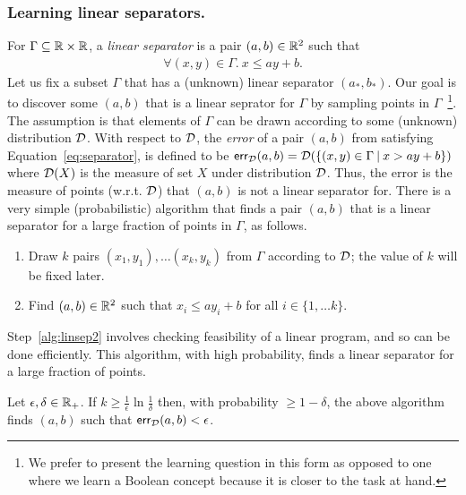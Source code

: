 \subsubsection{Learning linear separators.}
\label{Sec: discrepancy}
For $\Gamma \subseteq \reals\times\reals$, a \emph{linear separator}
is a pair $(a,b) \in \reals^2$ such that
\begin{align}
\forall (x,y) \in \Gamma.\ x \leq ay + b.
\label{eq:separator}
\end{align}
Let us fix a subset $\Gamma$ that has a (unknown) linear separator
$(a_*,b_*)$. Our goal is to discover some $(a,b)$ that is a linear
seprator for $\Gamma$ by sampling points in $\Gamma$~\footnote{We
  prefer to present the learning question in this form as opposed to
  one where we learn a Boolean concept because it is closer to the
  task at hand.}. The assumption is that elements of $\Gamma$ can be
drawn according to some (unknown) distribution ${\cal D}$. With
respect to ${\cal D}$, the \emph{error} of a pair $(a,b)$ from
satisfying Equation~\ref{eq:separator}, is defined to be
$\mathsf{err}_{{\cal D}}(a,b) = {\cal D}(\{(x,y) \in \Gamma\: |\: x >
ay+b\})$
where ${\cal D}(X)$ is the measure of set $X$ under distribution
${\cal D}$. Thus, the error is the measure of points (w.r.t. ${\cal
  D}$) that $(a,b)$ is not a linear separator for. There is a very
simple (probabilistic) algorithm that finds a pair $(a,b)$ that is a
linear separator for a large fraction of points in $\Gamma$, as
follows.
\begin{enumerate}
\itemsep0em 
\item\label{alg:linsep1} Draw $k$ pairs $(x_1,y_1), \ldots (x_k,y_k)$
  from $\Gamma$ according to ${\cal D}$; the value of $k$ will be
  fixed later.
\item\label{alg:linsep2} Find $(a,b) \in \reals^2$ such that $x_i
  \leq ay_i + b$ for all $i \in \{1,\ldots k\}$.
\end{enumerate}
Step~\ref{alg:linsep2} involves checking feasibility of a linear
program, and so can be done efficiently. This algorithm, with high
probability, finds a linear separator for a large fraction of points.
%
\begin{proposition}
 Let $\epsilon, \delta \in \plreals$. If
$k \geq \frac{1}{\epsilon}\ln\frac{1}{\delta}$ then, with probability
$\geq 1-\delta$, the above algorithm finds $(a,b)$ such that
$\mathsf{err}_{{\cal D}}(a,b) < \epsilon$.
\end{proposition}
%
